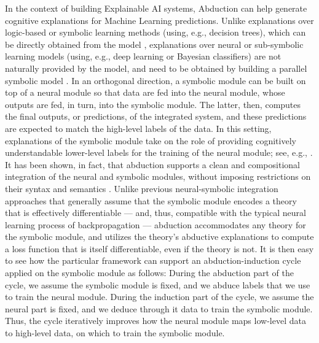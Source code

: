 In the context of building Explainable AI systems, Abduction can help generate cognitive explanations for Machine Learning predictions. Unlike explanations over logic-based or symbolic learning methods (using, e.g., decision trees), which can be directly obtained from the model , explanations over neural or sub-symbolic learning models (using, e.g., deep learning or Bayesian classifiers) are not naturally provided by the model, and need to be obtained by building a parallel symbolic model .
In an orthogonal direction, a symbolic module can be built on top of a neural module so that data are fed into the neural module, whose outputs are fed, in turn, into the symbolic module. The latter, then, computes the final outputs, or predictions, of the integrated system, and these predictions are expected to match the high-level labels of the data. In this setting, explanations of the symbolic module take on the role of providing cognitively understandable lower-level labels for the training of the neural module; see, e.g., .
It has been shown, in fact, that abduction supports a clean and compositional integration of the neural and symbolic modules, without imposing restrictions on their syntax and semantics . Unlike previous neural-symbolic integration approaches that generally assume that the symbolic module encodes a theory that is effectively differentiable --- and, thus, compatible with the typical neural learning process of backpropagation --- abduction accommodates any theory for the symbolic module, and utilizes the theory's abductive explanations to compute a loss function that is itself differentiable, even if the theory is not.
It is then easy to see how the particular framework can support an abduction-induction cycle applied on the symbolic module as follows: During the abduction part of the cycle, we assume the symbolic module is fixed, and we abduce labels that we use to train the neural module. During the induction part of the cycle, we assume the neural part is fixed, and we deduce through it data to train the symbolic module. Thus, the cycle iteratively improves how the neural module maps low-level data to high-level data, on which to train the symbolic module.

